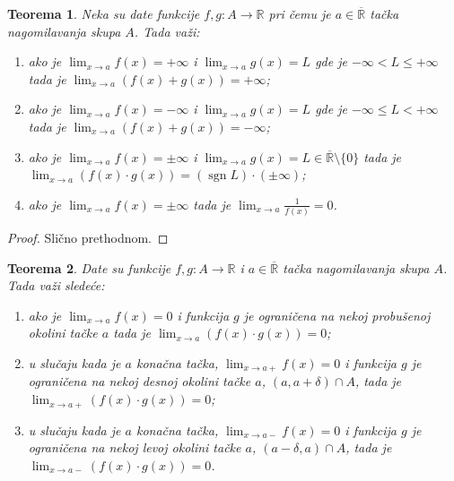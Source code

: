 \documentclass[a4paper,12pt]{article}
\theoremstyle{plain}
\newtheorem{theorem}{Teorema}[section]
\theoremstyle{definition}
\theoremstyle{remark}
\begin{document}
\begin{theorem}
    Neka su date funkcije $f, g : A \to \mathbb{R}$ pri čemu je $a \in \overline{\mathbb{R}}$ tačka nagomilavanja skupa $A$. Tada važi:
    \begin{enumerate}[label=\alph*)]
        \item ako je $\displaystyle \lim_{x \to a} f(x) = +\infty$ i $\displaystyle \lim_{x \to a} g(x) = L$ gde je $-\infty < L \le +\infty$ tada je \linebreak$\displaystyle \lim_{x \to a} (f(x) + g(x)) = +\infty$;
        \item ako je $\displaystyle \lim_{x \to a} f(x) = -\infty$ i $\displaystyle \lim_{x \to a} g(x) = L$ gde je $-\infty \le L < +\infty$ tada je \linebreak$\displaystyle \lim_{x \to a} (f(x) + g(x)) = -\infty$;
        \item ako je $\displaystyle \lim_{x \to a} f(x) = \pm\infty$ i $\displaystyle \lim_{x \to a} g(x) = L \in \overline{\mathbb{R}} \setminus \{0\}$ tada je $\displaystyle \lim_{x \to a} (f(x) \cdot g(x)) = (\operatorname{sgn} L) \cdot (\pm\infty)$;
        \item ako je $\displaystyle \lim_{x \to a} f(x) = \pm\infty$ tada je $\displaystyle \lim_{x \to a} \frac{1}{f(x)} = 0$.
    \end{enumerate}
\end{theorem}
\begin{proof}
    Slično prethodnom.
\end{proof}

\begin{theorem}
    Date su funkcije $f, g : A \to \mathbb{R}$ i $a \in \overline{\mathbb{R}}$ tačka nagomilavanja skupa $A$. Tada važi sledeće:
    \begin{enumerate}[label=\alph*)]
        \item ako je $\displaystyle \lim_{x \to a} f(x) = 0$ i funkcija $g$ je ograničena na nekoj probušenoj okolini tačke $a$ tada je $\displaystyle \lim_{x \to a} (f(x) \cdot g(x)) = 0$;
        \item u slučaju kada je $a$ konačna tačka, $\displaystyle \lim_{x \to a+} f(x) = 0$ i funkcija $g$ je ograničena na nekoj desnoj okolini tačke $a$, $(a, a + \delta) \cap A$, tada je $\displaystyle \lim_{x \to a+} (f(x) \cdot g(x)) = 0$;
        \item u slučaju kada je $a$ konačna tačka, $\displaystyle \lim_{x \to a-} f(x) = 0$ i funkcija $g$ je ograničena na nekoj levoj okolini tačke $a$, $(a - \delta, a) \cap A$, tada je $\displaystyle \lim_{x \to a-} (f(x) \cdot g(x)) = 0$.
    \end{enumerate}
\end{theorem}
\end{document}
